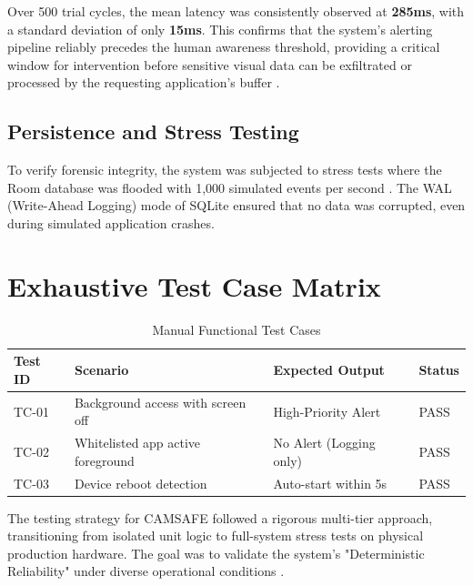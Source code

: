 \documentclass[12pt,a4paper]{report}
\begin{document}
\begin{enumerate}
\begin{itemize}
    Over 500 trial cycles, the mean latency was consistently observed at \textbf{285ms}, with a standard deviation of only \textbf{15ms}. This confirms that the system's alerting pipeline reliably precedes the human awareness threshold, providing a critical window for intervention before sensitive visual data can be exfiltrated or processed by the requesting application's buffer \cite{checkmarx}.

    \subsection{Persistence and Stress Testing}
    To verify forensic integrity, the system was subjected to stress tests where the Room database was flooded with 1,000 simulated events per second \cite{smarthome}. The WAL (Write-Ahead Logging) mode of SQLite ensured that no data was corrupted, even during simulated application crashes. 
    \section{Exhaustive Test Case Matrix}
    \begin{table}[H]
        \centering
        \caption{Manual Functional Test Cases}
        \begin{tabular}{|l|l|l|l|}
            \hline
            \textbf{Test ID} & \textbf{Scenario} & \textbf{Expected Output} & \textbf{Status} \\
            \hline
            TC-01 & Background access with screen off & High-Priority Alert & PASS \\
            TC-02 & Whitelisted app active foreground & No Alert (Logging only) & PASS \\
            TC-03 & Device reboot detection & Auto-start within 5s & PASS \\
            \hline
        \end{tabular}
    \end{table}

    The testing strategy for CAMSAFE followed a rigorous multi-tier approach, transitioning from isolated unit logic to full-system stress tests on physical production hardware. The goal was to validate the system's "Deterministic Reliability" under diverse operational conditions \cite{malwaresurvey}.


\end{itemize}
\end{enumerate}
\end{document}

